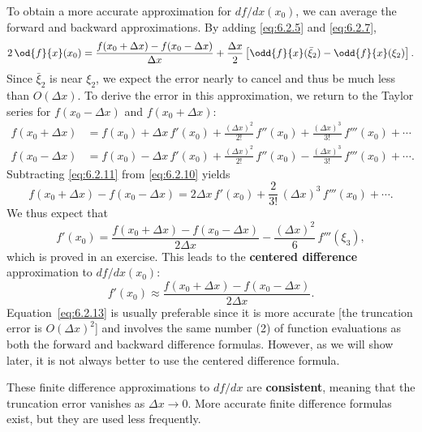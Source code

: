 To obtain a more accurate approximation for $df/dx(x_0)$, we can average the forward and backward approximations.  By adding \eqref{eq:6.2.5} and \eqref{eq:6.2.7},
\begin{equation}
2\,\od{f}{x}(x_0) = \frac{f(x_0 + \Delta x) - f(x_0 - \Delta x)}{\Delta x} + \frac{\Delta x}{2}\left[\odd{f}{x}(\bar{\xi}_2) - \odd{f}{x}(\xi_2)\right].
\label{eq:6.2.9}
\end{equation}
Since $\bar{\xi}_2$ is near $\xi_2$, we expect the error nearly to cancel and thus be much less than $O(\Delta x)$.  To derive the error in this approximation, we return to the Taylor series for $f(x_0 - \Delta x)$ and $f(x_0 + \Delta x)$:
\begin{align}
f(x_0 + \Delta x) &= f(x_0) + \Delta x\,f'(x_0) + \frac{(\Delta x)^2}{2!}\,f''(x_0) + \frac{(\Delta x)^3}{3!}\,f'''(x_0) + \cdots \label{eq:6.2.10} \\
f(x_0 - \Delta x) &= f(x_0) - \Delta x\,f'(x_0) + \frac{(\Delta x)^2}{2!}\,f''(x_0) - \frac{(\Delta x)^3}{3!}\,f'''(x_0) + \cdots. \label{eq:6.2.11}
\end{align}
Subtracting \eqref{eq:6.2.11} from \eqref{eq:6.2.10} yields
\[
f(x_0 + \Delta x) - f(x_0 - \Delta x) = 2\Delta x\,f'(x_0) + \frac{2}{3!}\,(\Delta x)^3\,f'''(x_0) + \cdots.
\]
We thus expect that
\begin{equation}
f'(x_0) = \frac{f(x_0 + \Delta x) - f(x_0 - \Delta x)}{2\Delta x} - \frac{(\Delta x)^2}{6}\,f'''(\xi_3),
\label{eq:6.2.12}
\end{equation}
which is proved in an exercise.  This leads to the \textbf{centered difference} approximation to $df/dx(x_0)$:
\begin{equation}
\boxed{f'(x_0) \approx \frac{f(x_0 + \Delta x) - f(x_0 - \Delta x)}{2\Delta x}.}
\label{eq:6.2.13}
\end{equation}
Equation~\eqref{eq:6.2.13} is usually preferable since it is more accurate [the truncation error is $O(\Delta x)^2$] and involves the same number (2) of function evaluations as both the forward and backward difference formulas.  However, as we will show later, it is not always better to use the centered difference formula.

These finite difference approximations to $df/dx$ are \textbf{consistent}, meaning that the truncation error vanishes as $\Delta x \to 0$.  More accurate finite difference formulas exist, but they are used less frequently.

